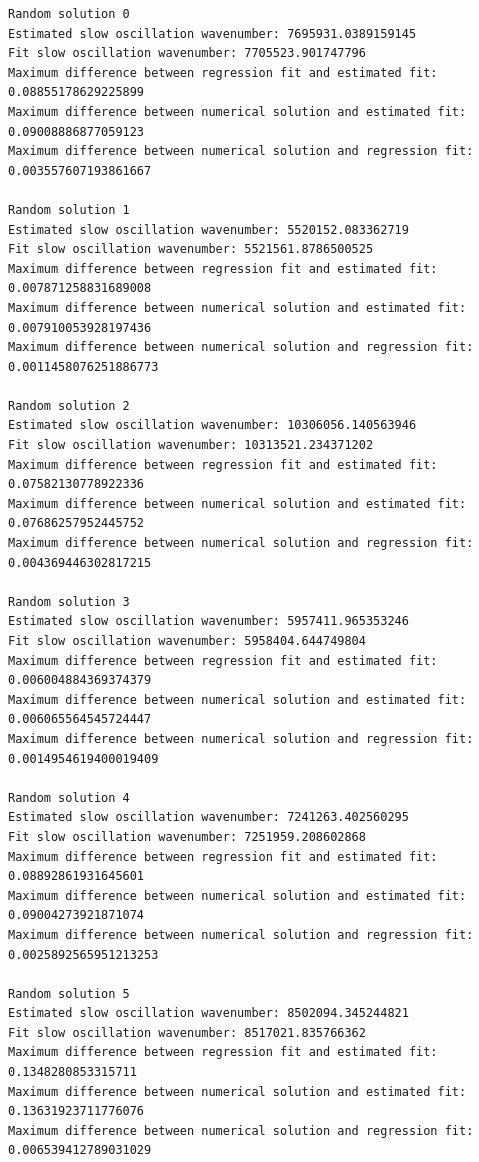 \documentclass[11pt]{article}
\begin{document}
    \begin{Verbatim}[commandchars=\\\{\}]
Random solution 0
Estimated slow oscillation wavenumber: 7695931.0389159145
Fit slow oscillation wavenumber: 7705523.901747796
Maximum difference between regression fit and estimated fit: 0.08855178629225899
Maximum difference between numerical solution and estimated fit:
0.09008886877059123
Maximum difference between numerical solution and regression fit:
0.003557607193861667

Random solution 1
Estimated slow oscillation wavenumber: 5520152.083362719
Fit slow oscillation wavenumber: 5521561.8786500525
Maximum difference between regression fit and estimated fit:
0.007871258831689008
Maximum difference between numerical solution and estimated fit:
0.007910053928197436
Maximum difference between numerical solution and regression fit:
0.0011458076251886773

Random solution 2
Estimated slow oscillation wavenumber: 10306056.140563946
Fit slow oscillation wavenumber: 10313521.234371202
Maximum difference between regression fit and estimated fit: 0.07582130778922336
Maximum difference between numerical solution and estimated fit:
0.07686257952445752
Maximum difference between numerical solution and regression fit:
0.004369446302817215

Random solution 3
Estimated slow oscillation wavenumber: 5957411.965353246
Fit slow oscillation wavenumber: 5958404.644749804
Maximum difference between regression fit and estimated fit:
0.006004884369374379
Maximum difference between numerical solution and estimated fit:
0.006065564545724447
Maximum difference between numerical solution and regression fit:
0.0014954619400019409

Random solution 4
Estimated slow oscillation wavenumber: 7241263.402560295
Fit slow oscillation wavenumber: 7251959.208602868
Maximum difference between regression fit and estimated fit: 0.08892861931645601
Maximum difference between numerical solution and estimated fit:
0.09004273921871074
Maximum difference between numerical solution and regression fit:
0.0025892565951213253

Random solution 5
Estimated slow oscillation wavenumber: 8502094.345244821
Fit slow oscillation wavenumber: 8517021.835766362
Maximum difference between regression fit and estimated fit: 0.1348280853315711
Maximum difference between numerical solution and estimated fit:
0.13631923711776076
Maximum difference between numerical solution and regression fit:
0.006539412789031029


\end{Verbatim}
\end{document}
